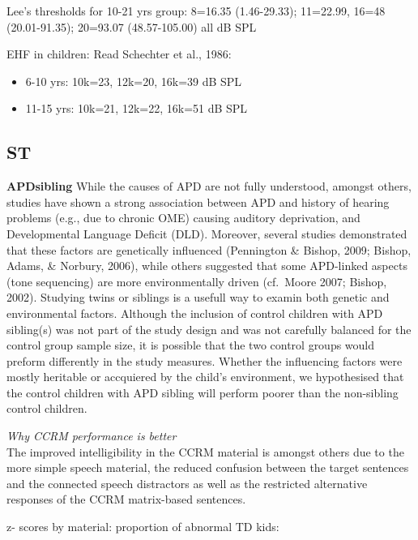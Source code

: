 \documentclass[a4paper, twoside]{templates/ociamthesis}
\begin{document}
Lee's thresholds for 10-21 yrs group: 8=16.35 (1.46-29.33); 11=22.99, 16=48 (20.01-91.35); 20=93.07 (48.57-105.00) all dB SPL

EHF in children: Read Schechter et al., 1986:

\begin{itemize}
\item
  6-10 yrs: 10k=23, 12k=20, 16k=39 dB SPL
\item
  11-15 yrs: 10k=21, 12k=22, 16k=51 dB SPL
\end{itemize}

\hypertarget{st-2}{%
\subsection{ST}\label{st-2}}

\begin{correction}
\textbf{APDsibling} While the causes of APD are not fully understood,
amongst others, studies have shown a strong association between APD and
history of hearing problems (e.g., due to chronic OME) causing auditory
deprivation, and Developmental Language Deficit (DLD). Moreover, several
studies demonstrated that these factors are genetically influenced
(Pennington \& Bishop, 2009; Bishop, Adams, \& Norbury, 2006), while
others suggested that some APD-linked aspects (tone sequencing) are more
environmentally driven (cf.~Moore 2007; Bishop, 2002). Studying twins or
siblings is a usefull way to examin both genetic and environmental
factors. Although the inclusion of control children with APD sibling(s)
was not part of the study design and was not carefully balanced for the
control group sample size, it is possible that the two control groups
would preform differently in the study measures. Whether the influencing
factors were mostly heritable or accquiered by the child's environment,
we hypothesised that the control children with APD sibling will perform
poorer than the non-sibling control children.
\end{correction}

\colorbox[HTML]{CCCCFF}{\emph{Why CCRM performance is better}}\\
The improved intelligibility in the CCRM material is amongst others due to the more simple speech material, the reduced confusion between the target sentences and the connected speech distractors as well as the restricted alternative responses of the CCRM matrix-based sentences.

z- scores by material:
proportion of abnormal TD kids:
\end{document}
